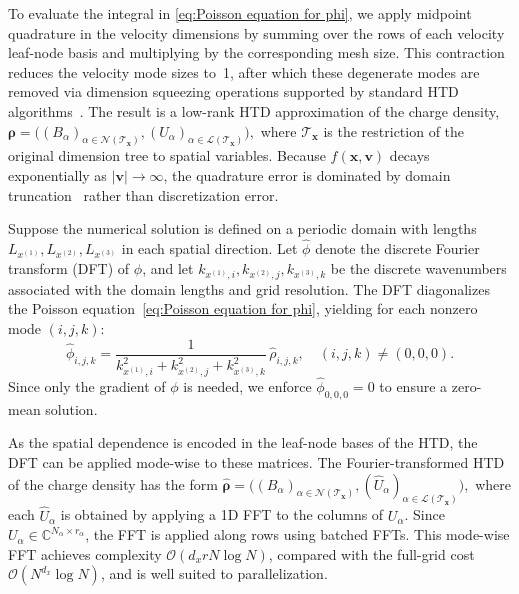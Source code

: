 \documentclass{article}
\theoremstyle{plain}
\theoremstyle{definition}
\theoremstyle{remark}
\begin{document}
To evaluate the integral in \eqref{eq:Poisson equation for phi}, we apply midpoint quadrature in the velocity dimensions by summing over the rows of each velocity leaf-node basis and multiplying by the corresponding mesh size.  
This contraction reduces the velocity mode sizes to~1, after which these degenerate modes are removed via dimension squeezing operations supported by standard HTD algorithms~\cite{kressner2012htucker}.  
The result is a low-rank HTD approximation of the charge density,
$
\bm{\rho} = \bigl((B_\alpha)_{\alpha \in \mathcal{N}(\mathcal{T}_{\bm{x}})}, (U_\alpha)_{\alpha \in \mathcal{L}(\mathcal{T}_{\bm{x}})}\bigr),
$
where 
$\mathcal{T}_{\bm{x}}$ is the restriction of the original dimension tree to spatial variables.  
Because $f(\bm{x}, \bm{v})$ decays exponentially as $|\bm{v}| \to \infty$, the quadrature error is dominated by domain truncation~\cite[Chap.~17]{boyd2001chebyshev} rather than discretization error.

Suppose the numerical solution is defined on a periodic domain with lengths $L_{x^{(1)}}, L_{x^{(2)}}, L_{x^{(3)}}$ in each spatial direction.  
Let $\widehat{\phi}$ denote the discrete Fourier transform (DFT) of $\phi$, and let $k_{x^{(1)},i}, k_{x^{(2)},j}, k_{x^{(3)},k}$ be the discrete wavenumbers associated with the domain lengths and grid resolution.  
The DFT diagonalizes the Poisson equation~\eqref{eq:Poisson equation for phi}, yielding for each nonzero mode $(i,j,k)$:
\begin{equation}
    \label{eq:FFT Poisson solution}
    \widehat{\phi}_{i,j,k} = \frac{1}{k_{x^{(1)},i}^{2} + k_{x^{(2)},j}^{2} + k_{x^{(3)},k}^{2}} \, \widehat{\rho}_{i,j,k}, 
    \quad (i,j,k) \neq (0,0,0).
\end{equation}
Since only the gradient of $\phi$ is needed, we enforce $\widehat{\phi}_{0,0,0} = 0$ to ensure a zero-mean solution.  

As the spatial dependence is encoded in the leaf-node bases of the HTD, the DFT can be applied mode-wise to these matrices. The Fourier-transformed HTD of the charge density has the form
$
\widehat{\bm{\rho}} = \bigl((B_\alpha)_{\alpha \in \mathcal{N}(\mathcal{T}_{\bm{x}})}, (\widehat{U}_\alpha)_{\alpha \in \mathcal{L}(\mathcal{T}_{\bm{x}})}\bigr),
$
where each $\widehat{U}_\alpha$ is obtained by applying a 1D FFT to the columns of $U_\alpha$.  
Since $U_\alpha \in \mathbb{C}^{N_\alpha \times r_\alpha}$, the FFT is applied along rows using batched FFTs. This mode-wise FFT achieves complexity $\mathcal{O}(d_x r N \log N)$, compared with the full-grid cost $\mathcal{O}(N^{d_x} \log N)$, and is well suited to parallelization.
\end{document}
